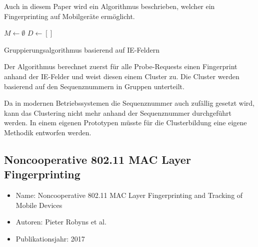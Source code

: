\clearpage

Auch in diesem Paper wird ein Algorithmus beschrieben, 
welcher ein Fingerprinting auf Mobilgeräte ermöglicht.

\begin{algorithm}
    \BlankLine
    $M \longleftarrow \emptyset$
    $ D \longleftarrow []$
    \caption{Gruppierungsalgorithmus basierend auf IE-Feldern
    \label{algorithm:ieattack}}
\end{algorithm}
    
Der Algorithmus berechnet zuerst für alle Probe-Requests einen Fingerprint
anhand der IE-Felder und weist diesen einem Cluster zu. 
Die Cluster werden basierend auf den Sequenznummern in Gruppen unterteilt.

Da in modernen Betriebssystemen die Sequenznummer auch zufällig gesetzt wird,
kann das Clustering nicht mehr anhand der Sequenznummer durchgeführt werden.
In einem eigenen Prototypen müsste für die Clusterbildung eine eigene
Methodik entworfen werden.

\clearpage

\subsection{Noncooperative 802.11 MAC Layer Fingerprinting}
\begin{itemize}
    \item Name: Noncooperative 802.11 MAC Layer Fingerprinting and Tracking
    of Mobile Devices
    \item Autoren: Pieter Robyns et al.
    \item Publikationsjahr: 2017
\end{itemize}

